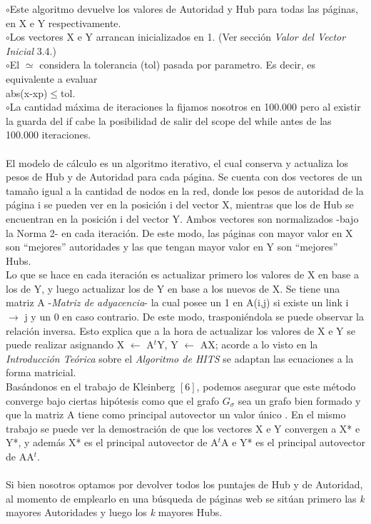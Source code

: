 \documentclass[a4paper]{article}
\begin{document}
$\circ$Este algoritmo devuelve los valores de Autoridad y Hub para todas las p\'aginas, en X e Y respectivamente.\\
\indent $\circ$Los vectores X e Y arrancan inicializados en 1. (Ver secci\'on \emph{Valor del Vector Inicial} 3.4.)\\
\indent $\circ$El $\simeq$ considera la tolerancia (tol) pasada por parametro. Es decir, es equivalente a evaluar \\ abs(x-xp)$\leq$tol. \\
\indent $\circ$La cantidad m\'axima de iteraciones la fijamos nosotros en 100.000 pero al existir la guarda del if cabe la posibilidad de salir del scope del while antes de las 100.000 iteraciones. \\
\\
\indent El modelo de c\'alculo es un algoritmo iterativo, el cual conserva y actualiza los pesos de Hub y de Autoridad para cada p\'agina. Se cuenta con dos vectores de un tama\~no igual a la cantidad de nodos en la red, donde los pesos de autoridad de la p\'agina i se pueden ver en la posici\'on i del vector X, mientras que los de Hub se encuentran en la posici\'on i del vector Y. Ambos vectores son normalizados -bajo la Norma 2- en cada iteraci\'on. De este modo, las p\'aginas con mayor valor en X son ``mejores'' autoridades y las que tengan mayor valor en Y son ``mejores'' Hubs. \\
\indent Lo que se hace en cada iteraci\'on es actualizar primero los valores de X en base a los de Y, y luego actualizar los de Y en base a los nuevos de X. Se tiene una matriz A -\textit{Matriz de adyacencia}- la cual posee un 1 en A(i,j) si existe un link i $\rightarrow$ j y un 0 en caso contrario. De este modo, trasponi\'endola se puede observar la relaci\'on inversa. Esto explica que a la hora de actualizar los valores de X e Y se puede realizar asignando X $\leftarrow$ A$^t$Y, Y $\leftarrow$ AX; acorde a lo visto en la \emph{Introducci\'on Te\'orica} sobre el \textit{Algoritmo de HITS} se adaptan las ecuaciones a la forma matricial.\\ 
\indent Bas\'andonos en el trabajo de Kleinberg $[6]$, podemos asegurar que este m\'etodo converge bajo ciertas hip\'otesis como que el grafo $G_\sigma$ sea un grafo bien formado y que la matriz A tiene como principal autovector un valor \'unico . En el mismo trabajo se puede ver la demostraci\'on  de que los vectores X e Y convergen a X* e Y*, y adem\'as X* es el principal autovector de A$^t$A e Y* es el principal autovector de AA$^t$.\\
\\
\indent Si bien nosotros optamos por devolver todos los puntajes de Hub y de Autoridad, al momento de emplearlo en una b\'usqueda de p\'aginas web se sit\'uan primero las \emph{k} mayores Autoridades y luego los \emph{k} mayores Hubs.
\end{document}
